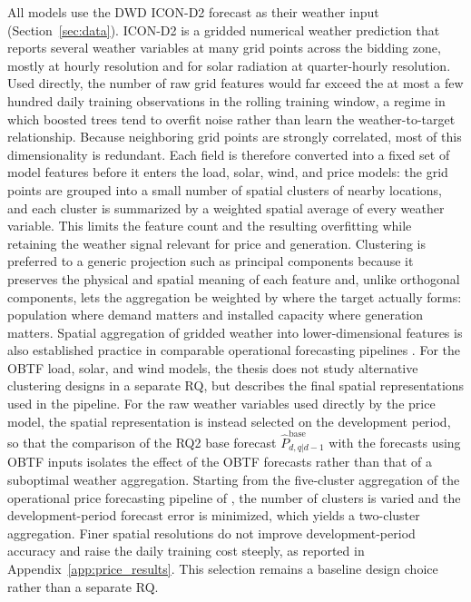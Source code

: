 All models use the DWD \mbox{ICON-D2} forecast as their weather input
(Section~\ref{sec:data}). \mbox{ICON-D2} is a gridded numerical weather
prediction that reports several weather variables at many grid points across
the bidding zone, mostly
at hourly resolution and for solar radiation at quarter-hourly resolution. Used
directly, the
number of raw grid features would far exceed the at most a few hundred daily
training observations in the rolling training window, a regime in which boosted
trees tend to overfit noise rather than learn the weather-to-target relationship. Because neighboring grid
points are strongly correlated, most of this dimensionality is redundant. Each
field is therefore converted into a fixed set of model features before it enters
the load, solar, wind, and price models: the grid points are grouped into a
small number of spatial clusters of nearby locations, and each cluster is
summarized by a weighted spatial average of every weather variable. This limits
the feature count and the resulting overfitting while retaining the weather
signal relevant for price and generation.
Clustering is preferred to a generic projection such as principal components
\cite{hastie2009elements} because it preserves the physical and spatial meaning of each feature and,
unlike orthogonal components, lets the aggregation be weighted by where the
target actually forms: population where demand matters and installed capacity
where generation matters. Spatial aggregation of gridded weather into
lower-dimensional features is also established practice in comparable
operational forecasting pipelines \cite{eiser2026operational}.
For the OBTF load, solar, and wind models, the thesis does not study alternative
clustering designs in a separate RQ, but describes the final spatial
representations used in the pipeline.
For the raw weather variables used directly by the price model, the spatial
representation is instead selected on the development period, so that the comparison of the RQ2 base forecast
\(\hat{P}^{\mathrm{base}}_{d,q|d-1}\) with the forecasts using OBTF inputs isolates
the effect of the OBTF forecasts rather than that of a suboptimal weather
aggregation. Starting from the five-cluster aggregation of
the operational price forecasting pipeline of \textcite{eiser2026operational}, the
number of clusters is varied and the development-period forecast error is
minimized, which yields a two-cluster aggregation. Finer spatial resolutions do
not improve development-period accuracy and raise the daily training cost
steeply, as reported in Appendix~\ref{app:price_results}. This selection remains
a baseline design choice rather than a separate RQ.

